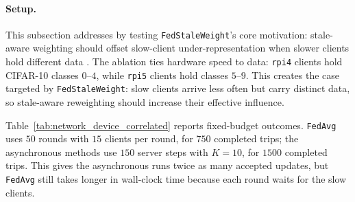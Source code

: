 \paragraph{Setup.}
This subsection addresses  by testing \texttt{FedStaleWeight}'s core motivation: stale-aware weighting should offset slow-client under-representation when slower clients hold different data \parencite{ma2024fedstaleweight}. The ablation ties hardware speed to data: \texttt{rpi4} clients hold CIFAR-10 classes \(0\)--\(4\), while \texttt{rpi5} clients hold classes \(5\)--\(9\). This creates the case targeted by \texttt{FedStaleWeight}: slow clients arrive less often but carry distinct data, so stale-aware reweighting should increase their effective influence.

Table~\ref{tab:network_device_correlated} reports fixed-budget outcomes. \texttt{FedAvg} uses \(50\) rounds with \(15\) clients per round, for \(750\) completed trips; the asynchronous methods use \(150\) server steps with \(K=10\), for \(1500\) completed trips. This gives the asynchronous runs twice as many accepted updates, but \texttt{FedAvg} still takes longer in wall-clock time because each round waits for the slow clients.

